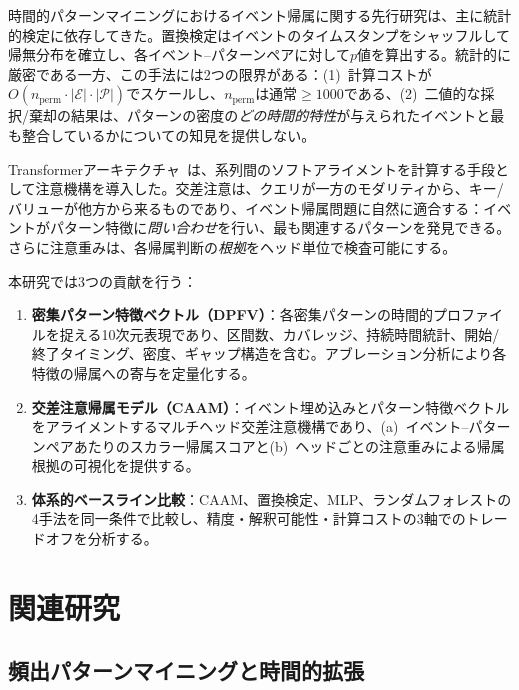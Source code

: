 \documentclass[sigconf,nonacm]{acmart}
\begin{document}
時間的パターンマイニングにおけるイベント帰属に関する先行研究は、主に統計的検定に依存してきた。置換検定はイベントのタイムスタンプをシャッフルして帰無分布を確立し、各イベント--パターンペアに対して$p$値を算出する。統計的に厳密である一方、この手法には2つの限界がある：(1)~計算コストが$O(n_{\text{perm}} \cdot |\mathcal{E}| \cdot |\mathcal{P}|)$でスケールし、$n_{\text{perm}}$は通常$\geq 1000$である、(2)~二値的な採択/棄却の結果は、パターンの密度の\emph{どの時間的特性}が与えられたイベントと最も整合しているかについての知見を提供しない。

Transformerアーキテクチャ~\cite{vaswani2017attention}は、系列間のソフトアライメントを計算する手段として注意機構を導入した。交差注意は、クエリが一方のモダリティから、キー/バリューが他方から来るものであり、イベント帰属問題に自然に適合する：イベントがパターン特徴に\emph{問い合わせ}を行い、最も関連するパターンを発見できる。さらに注意重みは、各帰属判断の\emph{根拠}をヘッド単位で検査可能にする。

本研究では3つの貢献を行う：

\begin{enumerate}
    \item \textbf{密集パターン特徴ベクトル（DPFV）}：各密集パターンの時間的プロファイルを捉える10次元表現であり、区間数、カバレッジ、持続時間統計、開始/終了タイミング、密度、ギャップ構造を含む。アブレーション分析により各特徴の帰属への寄与を定量化する。

    \item \textbf{交差注意帰属モデル（CAAM）}：イベント埋め込みとパターン特徴ベクトルをアライメントするマルチヘッド交差注意機構であり、(a)~イベント--パターンペアあたりのスカラー帰属スコアと(b)~ヘッドごとの注意重みによる帰属根拠の可視化を提供する。

    \item \textbf{体系的ベースライン比較}：CAAM、置換検定、MLP、ランダムフォレストの4手法を同一条件で比較し、精度・解釈可能性・計算コストの3軸でのトレードオフを分析する。
\end{enumerate}

\section{関連研究}
\label{sec:related}

\subsection{頻出パターンマイニングと時間的拡張}
\end{document}
